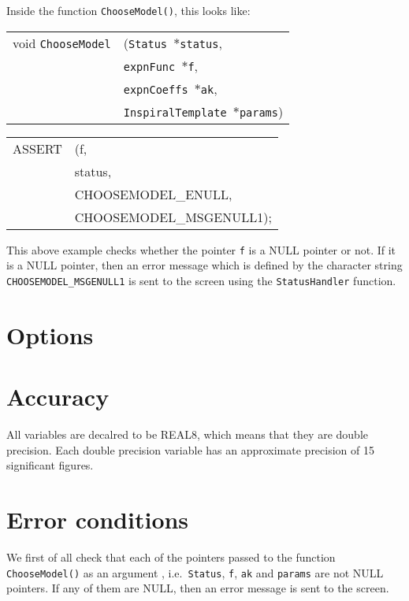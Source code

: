 \documentclass[12pt]{article}
\begin{document}
Inside the function \texttt{ChooseModel()}, this looks like:

\vspace{5mm}

\begin{tabular}{ll}
void \texttt{ChooseModel}&(\texttt{Status $\ast$status},     \\
                                   &\texttt{expnFunc $\ast$f}, \\
                                   &\texttt{expnCoeffs $\ast$ak}, \\
                                   &\texttt{InspiralTemplate $\ast$params})
\end{tabular}

\vspace{5mm}

\begin{tabular}{ll}
ASSERT & (f,  \\
       &  status,    \\
       &  CHOOSEMODEL\_ENULL, \\
       &  CHOOSEMODEL\_MSGENULL1);
\end{tabular}

\vspace{5mm}

This above example checks whether the pointer \texttt{f} is a NULL pointer or not. If it is a NULL pointer, then an error message which is defined by the character string \texttt{CHOOSEMODEL\_MSGENULL1} is sent to the screen using the \texttt{StatusHandler} function.


\section{Options}

 

\section{Accuracy}

All variables are decalred to be REAL8, which means that they are double precision.
Each double precision variable has an approximate precision of 15 significant figures.



\section{Error conditions}

We first of all check that each of the pointers passed to the function \\ \texttt{ChooseModel()} as an argument , i.e.\ \texttt{Status}, \texttt{f}, \texttt{ak} and \texttt{params} are not NULL pointers. If any of them are NULL, then an error message is sent to the screen.
\end{document}
